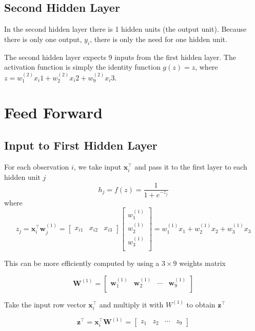 \documentclass[12pt]{article}%
\begin{document}
\subsection{Second Hidden Layer}

	In the second hidden layer there is 1 hidden units (the output unit). Because there is only one output, $y_i$, there is only the need for one hidden unit. 
	
	The second hidden layer expects 9 inputs from the first hidden layer. The activation function is simply the identity function $g(z) = z$, where $z = w^{(2)}_1 x_i1 + w^{(2)}_2 x_i2 + w^{(2)}_9 x_i3$.
	
	
	
\section{Feed Forward}

\subsection{Input to First Hidden Layer}

For each observation $i$, we take input $\mathbf{x}^\intercal_i$ and pass it to the first layer to each hidden unit $j$
	$$
	h_j = f(z) = \frac{1}{1 + e^{-z_j}}
	$$
	where 
	$$
	z_j = \mathbf{x}^\intercal_i \mathbf{w}^{(1)}_j 
	= \begin{bmatrix}
	x_{i1} & x_{i2} & x_{i3}
\end{bmatrix}
	\begin{bmatrix}
	w^{(1)}_1 \\
	w^{(1)}_2 \\
	w^{(1)}_3 \\
	\end{bmatrix}
	= w^{(1)}_1 x_1 + w^{(1)}_2 x_2 + w^{(1)}_3 x_3 
	$$
	
	This can be more efficiently computed by using a $3 \times 9$ weights matrix 
	
	$$
	\mathbf{W}^{(1)} = \begin{bmatrix}
	\mathbf{w}^{(1)}_1 &  \mathbf{w}^{(1)}_2 & \cdots & \mathbf{w}^{(1)}_9 \\
	\end{bmatrix}
	$$
	
	Take the input row vector $\mathbf{x}^\intercal_i$ and multiply it with $W^{(1)}$ to obtain $\mathbf{z}^\intercal$
	
	$$
	\mathbf{z}^\intercal = \mathbf{x}^\intercal_i \mathbf{W}^{(1)}
	= \begin{bmatrix}
	z_1 & z_2 & \cdots & z_9
	\end{bmatrix}
	$$
	
\end{document}
